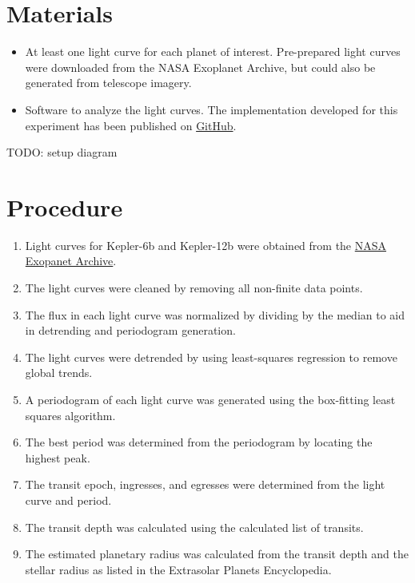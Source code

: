 \section{Materials}

\begin{itemize}
    \item At least one light curve for each planet of interest. Pre-prepared light curves were downloaded from the NASA Exoplanet Archive, but could
        also be generated from telescope imagery. \autocite{exoplanetArchive}
    \item Software to analyze the light curves. The implementation developed for this experiment has been published on \href{https://github.com/roguePanda/exoplanet-project}{GitHub}.
\end{itemize}

TODO: setup diagram

\section{Procedure}

\begin{enumerate}
    \item Light curves for Kepler-6b and Kepler-12b were obtained from the \href{http://exoplanetarchive.ipac.caltech.edu/}{NASA Exopanet Archive}.
    \item The light curves were cleaned by removing all non-finite data points.
    \item The flux in each light curve was normalized by dividing by the median to aid in detrending and periodogram generation.
    \item The light curves were detrended by using least-squares regression to remove global trends. \autocite{untrendy}
    \item A periodogram of each light curve was generated using the box-fitting least squares algorithm. \autocite{bls, pythonBls}
    \item The best period was determined from the periodogram by locating the highest peak.
    \item The transit epoch, ingresses, and egresses were determined from the light curve and period.
    \item The transit depth was calculated using the calculated list of transits.
    \item The estimated planetary radius was calculated from the transit depth and the stellar radius as listed in the Extrasolar Planets Encyclopedia. \autocite{exoplanetEncyclopedia}
\end{enumerate}
